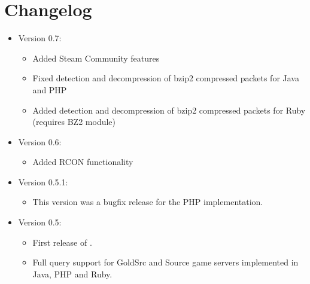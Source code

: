 \chapter{Changelog}

\begin{itemize}
  \item Version 0.7:
  		\begin{itemize}
            \item Added Steam Community features
            \item Fixed detection and decompression of bzip2 compressed packets
            for Java and PHP
            \item Added detection and decompression of bzip2 compressed packets
            for Ruby (requires BZ2 module)
		\end{itemize}
  \item Version 0.6:
  		\begin{itemize}
            \item Added RCON functionality
		\end{itemize}
  \item Version 0.5.1:
  		\begin{itemize}
            \item This version was a bugfix release for the PHP implementation.
		\end{itemize}
  \item Version 0.5:
  		\begin{itemize}
            \item First release of \steamcondenser.
            \item Full query support for GoldSrc and Source game servers implemented in Java, PHP and Ruby.
		\end{itemize}
\end{itemize}